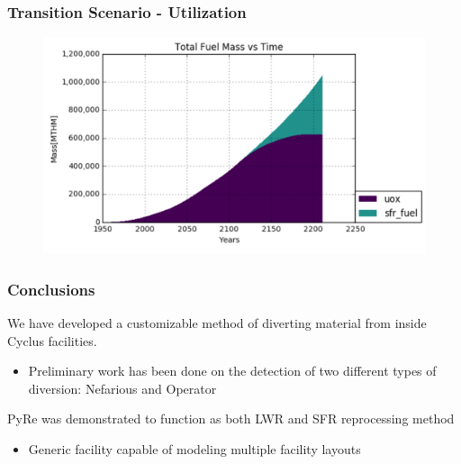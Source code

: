 \begin{frame}
\frametitle{Transition Scenario - Utilization}
\begin{figure}
	\includegraphics[width=\linewidth]{images/fuelmass}
\end{figure}
\end{frame}

\begin{frame}
\frametitle{Conclusions}
We have developed a customizable method of diverting material
from inside Cyclus facilities.
\begin{itemize}
	\item Preliminary work has been done on the detection of two
	different types of diversion: Nefarious and Operator
\end{itemize}
PyRe was demonstrated to function as both LWR and SFR
reprocessing method
\begin{itemize}
	\item Generic facility capable of modeling multiple facility layouts
\end{itemize}
\end{frame}